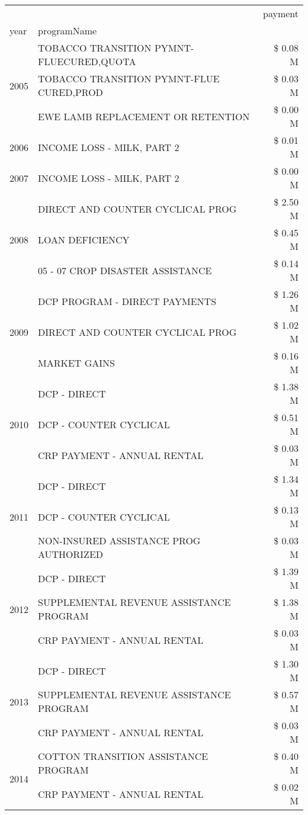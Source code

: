 \begin{tabular}{llr}
\toprule
 &  & payment \\
year & programName &  \\
\midrule
\multirow[t]{3}{*}{2005} & TOBACCO TRANSITION PYMNT-FLUECURED,QUOTA & \$ 0.08 M \\
 & TOBACCO TRANSITION PYMNT-FLUE CURED,PROD & \$ 0.03 M \\
 & EWE LAMB REPLACEMENT OR RETENTION & \$ 0.00 M \\
\cline{1-3}
2006 & INCOME LOSS - MILK, PART 2 & \$ 0.01 M \\
\cline{1-3}
2007 & INCOME LOSS - MILK, PART 2 & \$ 0.00 M \\
\cline{1-3}
\multirow[t]{3}{*}{2008} & DIRECT AND COUNTER CYCLICAL PROG & \$ 2.50 M \\
 & LOAN DEFICIENCY & \$ 0.45 M \\
 & 05 - 07 CROP DISASTER ASSISTANCE & \$ 0.14 M \\
\cline{1-3}
\multirow[t]{3}{*}{2009} & DCP PROGRAM - DIRECT PAYMENTS & \$ 1.26 M \\
 & DIRECT AND COUNTER CYCLICAL PROG & \$ 1.02 M \\
 & MARKET GAINS & \$ 0.16 M \\
\cline{1-3}
\multirow[t]{3}{*}{2010} & DCP - DIRECT & \$ 1.38 M \\
 & DCP - COUNTER CYCLICAL & \$ 0.51 M \\
 & CRP PAYMENT - ANNUAL RENTAL & \$ 0.03 M \\
\cline{1-3}
\multirow[t]{3}{*}{2011} & DCP - DIRECT & \$ 1.34 M \\
 & DCP - COUNTER CYCLICAL & \$ 0.13 M \\
 & NON-INSURED ASSISTANCE PROG AUTHORIZED & \$ 0.03 M \\
\cline{1-3}
\multirow[t]{3}{*}{2012} & DCP - DIRECT & \$ 1.39 M \\
 & SUPPLEMENTAL REVENUE ASSISTANCE PROGRAM & \$ 1.38 M \\
 & CRP PAYMENT - ANNUAL RENTAL & \$ 0.03 M \\
\cline{1-3}
\multirow[t]{3}{*}{2013} & DCP - DIRECT & \$ 1.30 M \\
 & SUPPLEMENTAL REVENUE ASSISTANCE PROGRAM & \$ 0.57 M \\
 & CRP PAYMENT - ANNUAL RENTAL & \$ 0.03 M \\
\cline{1-3}
\multirow[t]{3}{*}{2014} & COTTON TRANSITION ASSISTANCE PROGRAM & \$ 0.40 M \\
 & CRP PAYMENT - ANNUAL RENTAL & \$ 0.02 M \\

\end{tabular}
